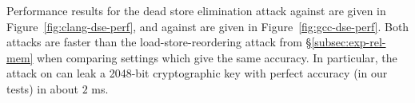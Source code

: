 Performance results for the dead store elimination attack against {\CLANG}
are given in Figure~\ref{fig:clang-dse-perf}, and against {\GCC} are given in
Figure~\ref{fig:gcc-dse-perf}.
Both attacks are faster than the load-store-reordering attack from
\S\ref{subsec:exp-rel-mem} when comparing settings which give the same
accuracy.
In particular, the attack on {\GCC} can leak a 2048-bit cryptographic
key with perfect accuracy (in our tests) in about $2$ ms.
